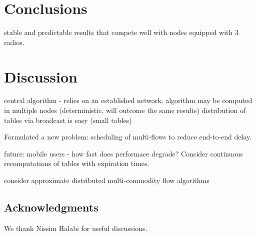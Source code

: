 \documentclass[12pt]{article}
\newenvironment{proof sketch}[1]{\noindent {\emph{Proof sketch of #1:}}}{\hfill \qed}
\begin{document}
\section{Conclusions}
stable and predictable results that compete well with nodes equipped with $3$ radios.



\section{Discussion}
central algorithm - relies on an established network.
algorithm may be computed in multiple nodes (deterministic, will outcome the same results)
distribution of tables via broadcast is easy (small tables)

Formulated a new problem: scheduling of multi-flows to reduce
end-to-end delay.

future:
mobile users - how fast does performace degrade?
Consider continuous recomputations of tables with expiration times.

consider approximate distributed multi-commodity flow algorithms


%
\ifnum{}
  \subsection*{Acknowledgments}
  We thank Nissim Halabi for useful discussions.
\fi
%




\newpage
\appendix
\end{document}

